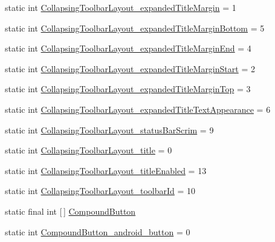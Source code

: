 \begin{DoxyCompactItemize}
static int \hyperlink{classandroid_1_1support_1_1v7_1_1mediarouter_1_1R_1_1styleable_ac9af9dc4bdced732d343d68c26940f9e}{Collapsing\+Toolbar\+Layout\+\_\+expanded\+Title\+Margin} = 1
\item 
static int \hyperlink{classandroid_1_1support_1_1v7_1_1mediarouter_1_1R_1_1styleable_ac08783d2f2f6cd0a8b8e66d9fc4f7c4c}{Collapsing\+Toolbar\+Layout\+\_\+expanded\+Title\+Margin\+Bottom} = 5
\item 
static int \hyperlink{classandroid_1_1support_1_1v7_1_1mediarouter_1_1R_1_1styleable_a99ffdbdeb16dfbadacaf7acae56a72e8}{Collapsing\+Toolbar\+Layout\+\_\+expanded\+Title\+Margin\+End} = 4
\item 
static int \hyperlink{classandroid_1_1support_1_1v7_1_1mediarouter_1_1R_1_1styleable_a59b6f64edf96c1e41a735bced54430bd}{Collapsing\+Toolbar\+Layout\+\_\+expanded\+Title\+Margin\+Start} = 2
\item 
static int \hyperlink{classandroid_1_1support_1_1v7_1_1mediarouter_1_1R_1_1styleable_ab761558efd3406c65c9f69c800bfca94}{Collapsing\+Toolbar\+Layout\+\_\+expanded\+Title\+Margin\+Top} = 3
\item 
static int \hyperlink{classandroid_1_1support_1_1v7_1_1mediarouter_1_1R_1_1styleable_a9562f47ec6ef350bc545bf9a99118b33}{Collapsing\+Toolbar\+Layout\+\_\+expanded\+Title\+Text\+Appearance} = 6
\item 
static int \hyperlink{classandroid_1_1support_1_1v7_1_1mediarouter_1_1R_1_1styleable_a33838f98949a195055bcd027fb0c8e1c}{Collapsing\+Toolbar\+Layout\+\_\+status\+Bar\+Scrim} = 9
\item 
static int \hyperlink{classandroid_1_1support_1_1v7_1_1mediarouter_1_1R_1_1styleable_ab2ba0d03f6955916a430e0ac530551d2}{Collapsing\+Toolbar\+Layout\+\_\+title} = 0
\item 
static int \hyperlink{classandroid_1_1support_1_1v7_1_1mediarouter_1_1R_1_1styleable_afd96eea83afe0af62d5c951105c47546}{Collapsing\+Toolbar\+Layout\+\_\+title\+Enabled} = 13
\item 
static int \hyperlink{classandroid_1_1support_1_1v7_1_1mediarouter_1_1R_1_1styleable_a4dcf16bdea9427a02434b698abe1f176}{Collapsing\+Toolbar\+Layout\+\_\+toolbar\+Id} = 10
\item 
static final int \mbox{[}$\,$\mbox{]} \hyperlink{classandroid_1_1support_1_1v7_1_1mediarouter_1_1R_1_1styleable_a9eda6207848fcda69affb749b57b23b9}{Compound\+Button}
\item 
static int \hyperlink{classandroid_1_1support_1_1v7_1_1mediarouter_1_1R_1_1styleable_a0ed04398a990ae9c2c98f7a798a8dd8c}{Compound\+Button\+\_\+android\+\_\+button} = 0

\end{DoxyCompactItemize}
